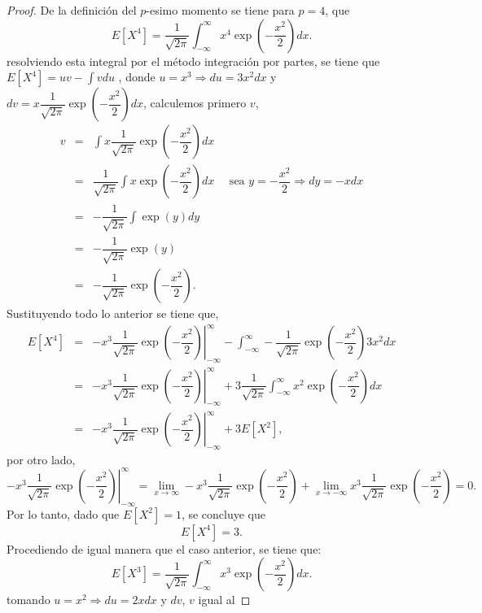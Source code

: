 \documentclass[
  letterpaper,
  DIV=11,
  numbers=noendperiod]{scrreprt}
\theoremstyle{plain}
\theoremstyle{definition}
\theoremstyle{remark}
\begin{document}
\begin{proof}

De la definición del \(p\)-esimo momento se tiene para \(p=4\), que \[
E\left[X^{4}\right]=\dfrac{1}{\sqrt{2\pi}}\int_{-\infty}^{\infty}x^{4}\exp\left(-\frac{x^{2}}{2}\right)d x.
\] resolviendo esta integral por el método integración por partes, se
tiene que \(E\left[X^{4}\right]=uv-\int vdu\) , donde
\(u=x^{3}\Longrightarrow du=3x^{2}dx\) y
\(dv=x\dfrac{1}{\sqrt{2\pi}}\exp{\left(-\dfrac{x^{2}}{2}\right)}dx\),
calculemos primero \(v\), \[
\begin{eqnarray*}
v & = & \int x\dfrac{1}{\sqrt{2\pi}}\exp{\left(-\dfrac{x^{2}}{2}\right)}dx\\
& = & \dfrac{1}{\sqrt{2\pi}}\int x\exp{\left(-\dfrac{x^{2}}{2}\right)}dx\quad\text{ sea } y=-\dfrac{x^{2}}{2}\Longrightarrow dy=-xdx\\
& = & -\dfrac{1}{\sqrt{2\pi}}\int \exp{\left(y\right)}dy\\
& = & -\dfrac{1}{\sqrt{2\pi}} \exp{\left(y\right)}\\
& = &  -\dfrac{1}{\sqrt{2\pi}}\exp{\left(-\dfrac{x^{2}}{2}\right)}.
\end{eqnarray*}
\] Sustituyendo todo lo anterior se tiene que, \[
\begin{eqnarray*}
    E\left[X^{4}\right] & = & \left.-x^{3}\dfrac{1}{\sqrt{2\pi}}\exp{\left(-\dfrac{x^{2}}{2}\right)}\right|_{-\infty}^{\infty}-\int_{-\infty}^{\infty} -\dfrac{1}{\sqrt{2\pi}}\exp{\left(-\dfrac{x^{2}}{2}\right)}3x^{2}dx\\
     & = & \left.-x^{3}\dfrac{1}{\sqrt{2\pi}}\exp{\left(-\dfrac{x^{2}}{2}\right)}\right|_{-\infty}^{\infty}+3\dfrac{1}{\sqrt{2\pi}}\int_{-\infty}^{\infty} x^{2}\exp{\left(-\dfrac{x^{2}}{2}\right)}dx\\
     & = & \left.-x^{3}\dfrac{1}{\sqrt{2\pi}}\exp{\left(-\dfrac{x^{2}}{2}\right)}\right|_{-\infty}^{\infty}+3E[X^{2}],
\end{eqnarray*}
\] por otro lado, \[
\left.-x^{3}\dfrac{1}{\sqrt{2\pi}}\exp{\left(-\dfrac{x^{2}}{2}\right)}\right|_{-\infty}^{\infty}=\lim_{x\to\infty}-x^{3}\dfrac{1}{\sqrt{2\pi}}\exp{\left(-\dfrac{x^{2}}{2}\right)}+\lim_{x\to-\infty}x^{3}\dfrac{1}{\sqrt{2\pi}}\exp{\left(-\dfrac{x^{2}}{2}\right)}=0.
\] Por lo tanto, dado que \(E[X^{2}]=1\), se concluye que \[ 
E\left[X^{4}\right]=3.
\] Procediendo de igual manera que el caso anterior, se tiene que: \[
E\left[X^{3}\right]=\dfrac{1}{\sqrt{2\pi}}\int_{-\infty}^{\infty}x^{3}\exp\left(-\frac{x^{2}}{2}\right)d x.
\] tomando \(u=x^{2}\Longrightarrow du=2xdx\) y \(dv\), \(v\) igual al

\end{proof}
\end{document}
